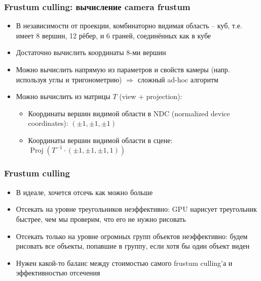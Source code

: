 \documentclass{beamer}
\begin{document}
\begin{frame}[fragile]
\frametitle{Frustum culling: вычисление camera frustum}
\begin{itemize}
\item В независимости от проекции, комбинаторно видимая область -- куб, т.е. имеет 8 вершин, 12 рёбер, и 6 граней, соединённых как в кубе
\pause
\item Достаточно вычислить координаты 8-ми вершин
\pause
\item Можно вычислить напрямую из параметров и свойств камеры (напр. используя углы и тригонометрию) \begin{math}\Rightarrow\end{math} сложный ad-hoc алгоритм
\pause
\item Можно вычислить из матрицы \begin{math}T\end{math} (view + projection):
\pause
\begin{itemize}
\item Координаты вершин видимой области в NDC (normalized device coordinates): \begin{math}(\pm 1, \pm 1, \pm 1)\end{math}
\pause
\item Координаты вершин видимой области в сцене: \begin{math}\operatorname{Proj}\left(T^{-1} \cdot (\pm 1, \pm 1, \pm 1, 1)\right)\end{math}
\end{itemize}
\end{itemize}
\end{frame}

\begin{frame}[fragile]
\frametitle{Frustum culling}
\begin{itemize}
\item В идеале, хочется отсечь как можно больше
\pause
\item Отсекать на уровне треугольников неэффективно: GPU нарисует треугольник быстрее, чем мы проверим, что его не нужно рисовать
\pause
\item Отсекать только на уровне огромных групп объектов неэффективно: будем рисовать все объекты, попавшие в группу, если хотя бы один объект виден
\pause
\item Нужен какой-то баланс между стоимостью самого frustum culling'а и эффективностью отсечения
\end{itemize}
\end{frame}
\end{document}
